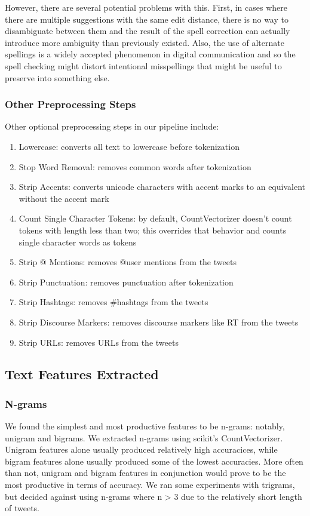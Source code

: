 \documentclass[11pt]{article}
\begin{document}
However, there are several potential problems with this. First, in cases where there are multiple suggestions with the same edit distance, there is no way to disambiguate between them and the result of the spell correction can actually introduce more ambiguity than previously existed. Also, the use of alternate spellings is a widely accepted phenomenon in digital communication and so the spell checking might distort intentional misspellings that might be useful to preserve into something else.

\subsubsection{Other Preprocessing Steps}
Other optional preprocessing steps in our pipeline include:
\begin{enumerate}
\item Lowercase: converts all text to lowercase before tokenization
\item Stop Word Removal: removes common words after tokenization
\item Strip Accents: converts unicode characters with accent marks to an equivalent without the accent mark
\item Count Single Character Tokens: by default, CountVectorizer doesn't count tokens with length less than two; this overrides that behavior and counts single character words as tokens
\item Strip @ Mentions: removes @user mentions from the tweets
\item Strip Punctuation: removes punctuation after tokenization
\item Strip Hashtags: removes \#hashtags from the tweets
\item Strip Discourse Markers: removes discourse markers like RT from the tweets
\item Strip URLs: removes URLs from the tweets
\end{enumerate}

\subsection{Text Features Extracted}

\subsubsection{N-grams}
We found the simplest and most productive features to be n-grams: notably, unigram and bigrams. We extracted n-grams using scikit's CountVectorizer. Unigram features alone usually produced relatively high accuracices, while bigram features alone usually produced some of the lowest accuracies. More often than not, unigram and bigram features in conjunction would prove to be the most productive in terms of accuracy. We ran some experiments with trigrams, but decided against using n-grams where n > 3 due to the relatively short length of tweets.
\end{document}
